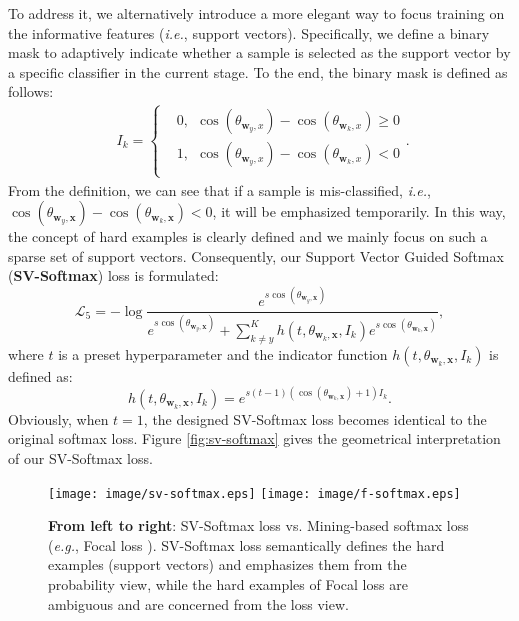 \documentclass[10pt,twocolumn,letterpaper]{article}
\begin{document}
To address it, we alternatively introduce a more elegant way to focus training on the informative features (\textit{i.e.}, support vectors). Specifically, we define a binary mask to adaptively indicate whether a sample is selected as the support vector by a specific classifier in the current stage. To the end, the binary mask is defined as follows:
\begin{equation}\label{weight}
\begin{aligned}
\ \  I_k =
 \left \{
   \begin{aligned}
  & 0,  \ \ \cos(\theta_{\bm{w}_y,x})-\cos(\theta_{\bm{w}_k,x})\geq 0 \\
  & 1, \ \ \cos(\theta_{\bm{w}_y,x})-\cos(\theta_{\bm{w}_k,x})< 0\\
   \end{aligned}
\right. .
\end{aligned}
\end{equation}
From the definition, we can see that if a sample is mis-classified, \textit{i.e.}, $\cos(\theta_{\bm{w}_y,\bm{x}})-\cos(\theta_{\bm{w}_k,\bm{x}})<0$, it will be emphasized temporarily. In this way, the concept of hard examples is clearly defined and we mainly focus on such a sparse set of support vectors. Consequently, our Support Vector Guided Softmax (\textbf{SV-Softmax}) loss is formulated:
\begin{equation}\label{SV-Softmax}
\mathcal{L}_5 = - \log\frac{e^{s\cos(\theta_{\bm{w}_y,\bm{x}})}}{e^{s\cos(\theta_{\bm{w}_y,\bm{x}})}+\sum_{k\neq y}^K h(t,\theta_{\bm{w}_k,\bm{x}},I_k)e^{s\cos(\theta_{\bm{w}_k,\bm{x}})}},
\end{equation}
where $t$ is a preset hyperparameter and the indicator function $h(t,\theta_{\bm{w}_k,\bm{x}},I_k)$ is defined as:
\begin{equation}
 h(t,\theta_{\bm{w}_k,\bm{x}},I_k)=e^{s(t-1)(\cos(\theta_{\bm{w}_k,\bm{x}})+1)I_k}.
\end{equation}
Obviously, when $t=1$, the designed SV-Softmax loss becomes identical to the original softmax loss. Figure \ref{fig:sv-softmax} gives the geometrical interpretation of our SV-Softmax loss.

\begin{figure}[t]
\begin{center}
 \texttt{[image: image/sv-softmax.eps]}
 \texttt{[image: image/f-softmax.eps]}
\end{center}
   \caption{\textbf{From left to right}: SV-Softmax loss vs. Mining-based softmax loss (\textit{e.g.}, Focal loss \cite{Focal}). SV-Softmax loss semantically defines the hard examples (support vectors) and emphasizes them from the probability view, while the hard examples of Focal loss are ambiguous and are concerned from the loss view. }
\label{fig:sv-mining}
\end{figure}
\end{document}
